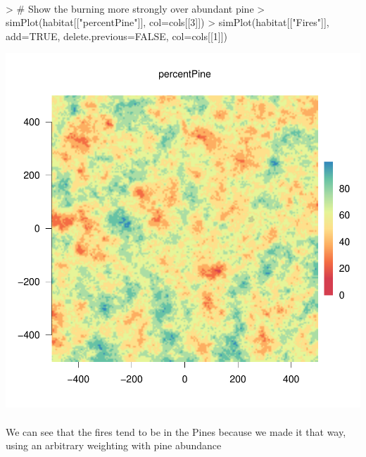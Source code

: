 \documentclass{article}
\begin{document}
\paragraph{}


\begin{Schunk}
\begin{Sinput}
> # Show the burning more strongly over abundant pine
> simPlot(habitat[["percentPine"]], col=cols[[3]])
> simPlot(habitat[["Fires"]], add=TRUE, delete.previous=FALSE, col=cols[[1]])
\end{Sinput}
\end{Schunk}
\includegraphics{introduction-fire-overlaid}


\paragraph{}
We can see that the fires tend to be in the Pines because we made it that way, using an arbitrary weighting with pine abundance
\end{document}
